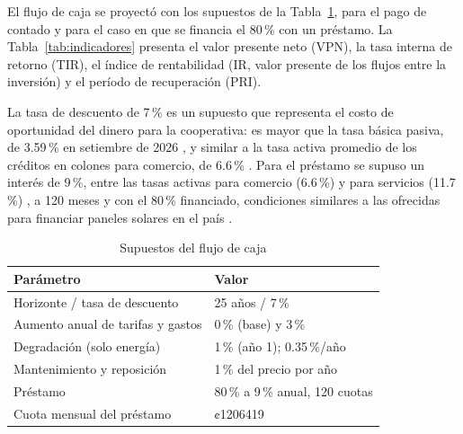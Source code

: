 El flujo de caja se proyectó con los supuestos de la Tabla~\ref{tab:supuestos}, para el pago de contado y para el caso en que se financia el 80\,\% con un préstamo. La Tabla~\ref{tab:indicadores} presenta el valor presente neto (VPN), la tasa interna de retorno (TIR), el índice de rentabilidad (IR, valor presente de los flujos entre la inversión) y el período de recuperación (PRI).

La tasa de descuento de 7\,\% es un supuesto que representa el costo de oportunidad del dinero para la cooperativa: es mayor que la tasa básica pasiva, de 3.59\,\% en setiembre de 2026 \cite{bccr_tbp}, y similar a la tasa activa promedio de los créditos en colones para comercio, de 6.6\,\% \cite{bccr_tan}. Para el préstamo se supuso un interés de 9\,\%, entre las tasas activas para comercio (6.6\,\%) y para servicios (11.7\,\%) \cite{bccr_tan}, a 120 meses y con el 80\,\% financiado, condiciones similares a las ofrecidas para financiar paneles solares en el país \cite{bancopopular, avolta}.

\begin{table}[!htb]
\caption{Supuestos del flujo de caja}
\label{tab:supuestos}
\centering
\footnotesize
\setlength{\tabcolsep}{3pt}
\begin{tabular}{l l}
\toprule
Parámetro & Valor \\
\midrule
Horizonte / tasa de descuento & 25 años / 7\,\% \\
Aumento anual de tarifas y gastos & 0\,\% (base) y 3\,\% \\
Degradación (solo energía) & 1\,\% (año 1); 0.35\,\%/año \\
Mantenimiento y reposición & 1\,\% del precio por año \\
Préstamo & 80\,\% a 9\,\% anual, 120 cuotas \\
Cuota mensual del préstamo & ¢\num{1206419} \\
\bottomrule
\end{tabular}
\end{table}

